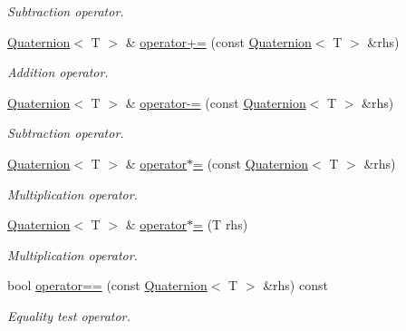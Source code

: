 \begin{DoxyCompactItemize}
\begin{DoxyCompactList}\small\item\em Subtraction operator. \item\end{DoxyCompactList}\item 
\hyperlink{class_quaternion}{Quaternion}$<$ T $>$ \& \hyperlink{class_quaternion_a2567e2242703dbb3f82571f47410e553}{operator+=} (const \hyperlink{class_quaternion}{Quaternion}$<$ T $>$ \&rhs)
\begin{DoxyCompactList}\small\item\em Addition operator. \item\end{DoxyCompactList}\item 
\hyperlink{class_quaternion}{Quaternion}$<$ T $>$ \& \hyperlink{class_quaternion_a2d5c3cdfa00f6f978d29dde5de55f067}{operator-\/=} (const \hyperlink{class_quaternion}{Quaternion}$<$ T $>$ \&rhs)
\begin{DoxyCompactList}\small\item\em Subtraction operator. \item\end{DoxyCompactList}\item 
\hyperlink{class_quaternion}{Quaternion}$<$ T $>$ \& \hyperlink{class_quaternion_ac1674c5911091daed8266b997d5a3bdd}{operator$\ast$=} (const \hyperlink{class_quaternion}{Quaternion}$<$ T $>$ \&rhs)
\begin{DoxyCompactList}\small\item\em Multiplication operator. \item\end{DoxyCompactList}\item 
\hyperlink{class_quaternion}{Quaternion}$<$ T $>$ \& \hyperlink{class_quaternion_a25cccfb4a4738744cba0b4b4b47c82ed}{operator$\ast$=} (T rhs)
\begin{DoxyCompactList}\small\item\em Multiplication operator. \item\end{DoxyCompactList}\item 
bool \hyperlink{class_quaternion_ab044ab0bf000fd1ed6937e4861b039e2}{operator==} (const \hyperlink{class_quaternion}{Quaternion}$<$ T $>$ \&rhs) const 
\begin{DoxyCompactList}\small\item\em Equality test operator. \item\end{DoxyCompactList}\item 

\end{DoxyCompactItemize}
